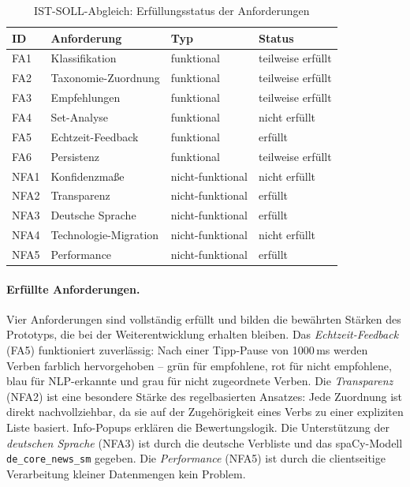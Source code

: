 \begin{table}[H]
\caption{IST-SOLL-Abgleich: Erfüllungsstatus der Anforderungen\label{tab:ist-soll}}
\centering
\small
\begin{tabular}{llll}
\hline
\textbf{ID} & \textbf{Anforderung} & \textbf{Typ} & \textbf{Status} \\
\hline
FA1 & Klassifikation         & funktional       & teilweise erfüllt \\
FA2 & Taxonomie-Zuordnung    & funktional       & teilweise erfüllt \\
FA3 & Empfehlungen           & funktional       & teilweise erfüllt \\
FA4 & Set-Analyse            & funktional       & nicht erfüllt \\
FA5 & Echtzeit-Feedback      & funktional       & erfüllt \\
FA6 & Persistenz             & funktional       & teilweise erfüllt \\
\hline
NFA1 & Konfidenzmaße         & nicht-funktional & nicht erfüllt \\
NFA2 & Transparenz           & nicht-funktional & erfüllt \\
NFA3 & Deutsche Sprache      & nicht-funktional & erfüllt \\
NFA4 & Technologie-Migration & nicht-funktional & nicht erfüllt \\
NFA5 & Performance           & nicht-funktional & erfüllt \\
\hline
\end{tabular}
\end{table}

\paragraph{Erfüllte Anforderungen.}

Vier Anforderungen sind vollständig erfüllt und bilden die bewährten Stärken des Prototyps, die bei der Weiterentwicklung erhalten bleiben.
Das \emph{Echtzeit-Feedback} (FA5) funktioniert zuverlässig: Nach einer Tipp-Pause von 1000\,ms werden Verben farblich hervorgehoben -- grün für empfohlene, rot für nicht empfohlene, blau für NLP-erkannte und grau für nicht zugeordnete Verben.
Die \emph{Transparenz} (NFA2) ist eine besondere Stärke des regelbasierten Ansatzes: Jede Zuordnung ist direkt nachvollziehbar, da sie auf der Zugehörigkeit eines Verbs zu einer expliziten Liste basiert.
Info-Popups erklären die Bewertungslogik.
Die Unterstützung der \emph{deutschen Sprache} (NFA3) ist durch die deutsche Verbliste und das spaCy-Modell \texttt{de\_core\_news\_sm} gegeben.
Die \emph{Performance} (NFA5) ist durch die clientseitige Verarbeitung kleiner Datenmengen kein Problem.

